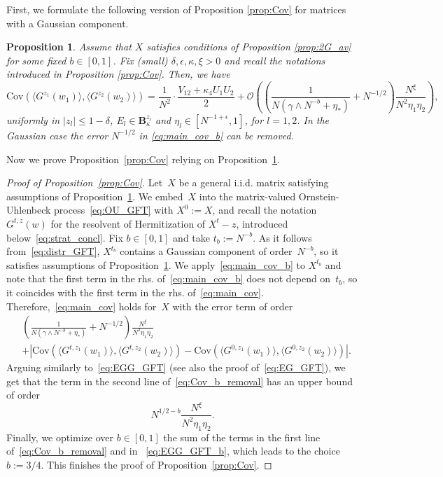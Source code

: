 \documentclass[10pt]{amsart}
\newtheorem{proposition}[theorem]{Proposition}
\numberwithin{equation}{section}
\newcommand{\Cov}{\mathrm{Cov}}
\begin{document}
First, we formulate the following version of Proposition \ref{prop:Cov} for matrices with a Gaussian component.

\begin{proposition}\label{prop:Cov_b} Assume that $X$ satisfies conditions of Proposition \ref{prop:2G_av} for some fixed $b\in [0,1]$. Fix (small) $\delta, \epsilon,\kappa,\xi>0$ and recall the notations introduced in Proposition \ref{prop:Cov}. Then, we have
\begin{equation}
\Cov \left(\langle G^{z_1}(w_1)\rangle,\langle G^{z_2}(w_2)\rangle\right) = \frac{1}{N^2}\cdot \frac{V_{12}+\kappa_4U_1U_2}{2} + \mathcal{O}\left(\left(\frac{1}{N(\gamma\wedge N^{-b} + \eta_*)} + N^{-1/2} \right)\frac{N^\xi}{N^2\eta_1\eta_2}\right),
\label{eq:main_cov_b}
\end{equation}
uniformly in $|z_l|\le 1-\delta$, $E_l\in\mathbf{B}_\kappa^{z_l}$ and $\eta_l\in [N^{-1+\epsilon}, 1]$, for $l=1,2$. In the Gaussian case the error $N^{-1/2}$ in \eqref{eq:main_cov_b} can be removed.
\end{proposition}

Now we prove Proposition~\ref{prop:Cov} relying on Proposition~\ref{prop:Cov_b}.

\begin{proof}[Proof of Proposition~\ref{prop:Cov}] Let~$X$ be a general i.i.d. matrix satisfying assumptions of Proposition~\ref{prop:Cov_b}. We embed~$X$ into the matrix-valued Ornstein-Uhlenbeck process~\eqref{eq:OU_GFT} with $X^0:=X$, and recall the notation $G^{t,z}(w)$ for the resolvent of Hermitization of $X^t-z$, introduced below~\eqref{eq:strat_concl}. Fix $b\in [0,1]$ and take $t_b:=N^{-b}$. As it follows from~\eqref{eq:distr_GFT}, $X^{t_b}$ contains a Gaussian component of order~$N^{-b}$, so it satisfies assumptions of Proposition~\ref{prop:Cov_b}. We apply~\eqref{eq:main_cov_b} to $X^{t_b}$ and note that the first term in the rhs. of~\eqref{eq:main_cov_b} does not depend on~$t_b$, so it coincides with the first term in the rhs. of~\eqref{eq:main_cov}. Therefore,~\eqref{eq:main_cov} holds for~$X$ with the error term of order
\begin{equation}
\begin{split}
&\left(\frac{1}{N(\gamma\wedge N^{-b} + \eta_*)} + N^{-1/2} \right)\frac{N^\xi}{N^2\eta_1\eta_2}\\
&+ \left\vert \Cov \left(\langle G^{t,z_1}(w_1)\rangle,\langle G^{t,z_2}(w_2)\rangle\right) - \Cov \left(\langle G^{0,z_1}(w_1)\rangle,\langle G^{0,z_2}(w_2)\rangle\right)\right\vert. 
\end{split}
\label{eq:Cov_b_removal}
\end{equation} 
Arguing similarly to~\eqref{eq:EGG_GFT} (see also the proof of~\eqref{eq:EG_GFT}), we get that the term in the second line of~\eqref{eq:Cov_b_removal} has an upper bound of order
\begin{equation}
N^{1/2-b}\frac{N^\xi}{N^2\eta_1\eta_2}.
\label{eq:EGG_GFT_b}
\end{equation}
Finally, we optimize over $b\in [0,1]$ the sum of the terms in the first line of~\eqref{eq:Cov_b_removal} and in ~\eqref{eq:EGG_GFT_b}, which leads to the choice $b:=3/4$. This finishes the proof of Proposition~\ref{prop:Cov}.  
\end{proof}
\end{document}
